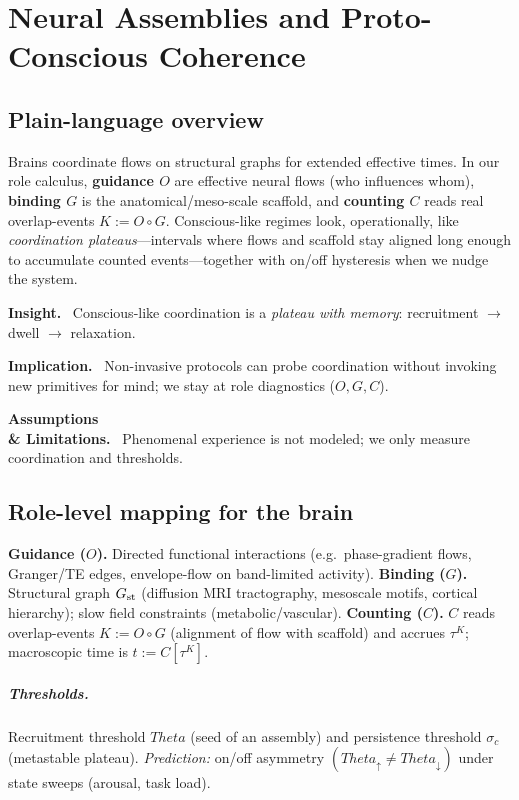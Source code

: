 \documentclass[12pt,a4paper,oneside]{scrreprt}
\def\Theta{Theta}%
\newenvironment{insight}{\par\vspace{0.5em}\noindent\textbf{Insight.}\ }{\par\vspace{0.5em}}
\newenvironment{implication}{\par\vspace{0.5em}\noindent\textbf{Implication.}\ }{\par\vspace{0.5em}}
\newenvironment{limitation}{\par\vspace{0.5em}\noindent\textbf{Assumptions \\ \& Limitations.}\ }{\par\vspace{0.5em}}
\begin{document}
\chapter{Neural Assemblies and Proto-Conscious Coherence}\label{ch:human-neural}

\section*{Plain-language overview}
Brains coordinate flows on structural graphs for extended effective times. 
In our role calculus, \textbf{guidance $O$} are effective neural flows (who influences whom), \textbf{binding $G$} is the anatomical/meso-scale scaffold, and \textbf{counting $C$} reads real overlap-events $K:=O\!\circ G$. 
Conscious-like regimes look, operationally, like \emph{coordination plateaus}—intervals where flows and scaffold stay aligned long enough to accumulate counted events—together with on/off hysteresis when we nudge the system.

\begin{insight}
Conscious-like coordination is a \emph{plateau with memory}: recruitment $\to$ dwell $\to$ relaxation.
\end{insight}
\begin{implication}
Non-invasive protocols can probe coordination without invoking new primitives for mind; we stay at role diagnostics ($O,G,C$).
\end{implication}
\begin{limitation}
Phenomenal experience is not modeled; we only measure coordination and thresholds.
\end{limitation}

\section{Role-level mapping for the brain}\label{sec:human-mapping}
\textbf{Guidance ($O$).} Directed functional interactions (e.g.\ phase-gradient flows, Granger/TE edges, envelope-flow on band-limited activity).  
\textbf{Binding ($G$).} Structural graph $G_{\rm st}$ (diffusion MRI tractography, mesoscale motifs, cortical hierarchy); slow field constraints (metabolic/vascular).  
\textbf{Counting ($C$).} $C$ reads overlap-events $K:=O\!\circ G$ (alignment of flow with scaffold) and accrues $\tau^K$; macroscopic time is $t:=C[\tau^K]$.

\paragraph{Thresholds.}
Recruitment threshold $\Theta$ (seed of an assembly) and persistence threshold $\sigma_c$ (metastable plateau). 
\emph{Prediction:} on/off asymmetry $(\Theta_\uparrow\neq\Theta_\downarrow)$ under state sweeps (arousal, task load).
\end{document}
